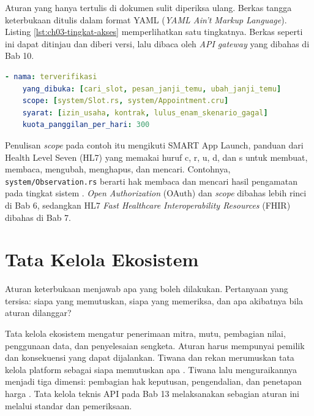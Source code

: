 \begin{pendalaman}[title={Pendalaman Teknis (opsional): Aturan Akses sebagai Berkas}]
Aturan yang hanya tertulis di dokumen sulit diperiksa ulang. Berkas tangga keterbukaan ditulis dalam
format YAML (\textit{YAML Ain't Markup Language}). Listing \ref{lst:ch03-tingkat-akses} memperlihatkan
satu tingkatnya. Berkas seperti ini dapat ditinjau dan diberi versi, lalu dibaca oleh \textit{API gateway}
yang dibahas di Bab 10.

\begin{lstlisting}[language=yaml, caption={Tingkat terverifikasi, tersedia di \berkas{sources/chapter03/tingkat-akses-mitra.yaml}}, label={lst:ch03-tingkat-akses}]
  - nama: terverifikasi
    yang_dibuka: [cari_slot, pesan_janji_temu, ubah_janji_temu]
    scope: [system/Slot.rs, system/Appointment.cru]
    syarat: [izin_usaha, kontrak, lulus_enam_skenario_gagal]
    kuota_panggilan_per_hari: 300
\end{lstlisting}

Penulisan \textit{scope} pada contoh itu mengikuti SMART App Launch, panduan dari Health Level Seven (HL7)
yang memakai huruf c, r, u, d, dan s untuk membuat, membaca, mengubah, menghapus, dan mencari. Contohnya,
\texttt{system/Observation.rs} berarti hak membaca dan mencari hasil pengamatan pada tingkat sistem
\cite{c03-smart-app-launch}. \textit{Open Authorization} (OAuth) dan \textit{scope} dibahas lebih rinci di
Bab 6, sedangkan HL7 \textit{Fast Healthcare Interoperability Resources} (FHIR) dibahas di Bab 7.
\end{pendalaman}

\section{Tata Kelola Ekosistem}

Aturan keterbukaan menjawab apa yang boleh dilakukan. Pertanyaan yang tersisa: siapa yang memutuskan,
siapa yang memeriksa, dan apa akibatnya bila aturan dilanggar?

Tata kelola ekosistem mengatur penerimaan mitra, mutu, pembagian nilai, penggunaan data, dan penyelesaian
sengketa. Aturan harus mempunyai pemilik dan konsekuensi yang dapat dijalankan. Tiwana dan rekan merumuskan
tata kelola platform sebagai siapa memutuskan apa \cite{tiwana2010platform}. Tiwana lalu menguraikannya
menjadi tiga dimensi: pembagian hak keputusan, pengendalian, dan penetapan harga
\cite{tiwana2014platform}. Tata kelola teknis API pada Bab 13 melaksanakan sebagian aturan ini melalui
standar dan pemeriksaan.

